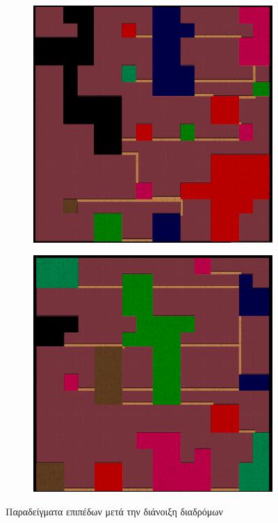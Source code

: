 \begin{figure}[H]
\begin{subfigure}{.5\textwidth}
  \includegraphics[width=.8\linewidth]{../images/colored_rooms/c_3.png}
  \label{fig:sfig1}
\end{subfigure}%
\begin{subfigure}{.5\textwidth}
  \centering
  \includegraphics[width=.8\linewidth]{../images/colored_rooms/c_4.png}
  \label{fig:sfig2}
\end{subfigure}
\caption{Παραδείγματα επιπέδων μετά την διάνοιξη διαδρόμων}
\label{fig:fig}
\end{figure}












